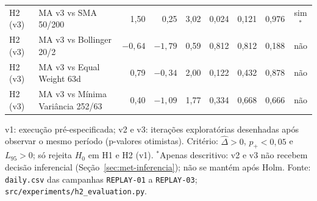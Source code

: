 \begin{table}[H]
{\begin{tabular}{llrrrrrrc}
H2 (v3) & MA v3 vs SMA 50/200 & 1{,}50 & 0{,}25 & 3{,}02 & 0{,}024 & 0{,}121 & 0{,}976 & sim$^{*}$ \\
H2 (v3) & MA v3 vs Bollinger 20/2 & $-0{,}64$ & $-1{,}79$ & 0{,}59 & 0{,}812 & 0{,}812 & 0{,}188 & não \\
H2 (v3) & MA v3 vs Equal Weight 63d & 0{,}79 & $-0{,}34$ & 2{,}00 & 0{,}122 & 0{,}432 & 0{,}878 & não \\
H2 (v3) & MA v3 vs Mínima Variância 252/63 & 0{,}40 & $-1{,}09$ & 1{,}77 & 0{,}334 & 0{,}668 & 0{,}666 & não \\
\bottomrule
\end{tabular}}
\par\smallskip\footnotesize v1: execução pré-especificada; v2 e v3: iterações exploratórias desenhadas após observar o mesmo período (p-valores otimistas). Critério: $\hat{\Delta} > 0$, $p_+ < 0{,}05$ e $L_{95} > 0$; só rejeita $H_0$ em H1 e H2 (v1). $^{*}$Apenas descritivo: v2 e v3 não recebem decisão inferencial (Seção~\ref{sec:met-inferencia}); não se mantém após Holm. Fonte: \texttt{daily.csv} das campanhas \texttt{REPLAY-01} a \texttt{REPLAY-03}; \texttt{src/experiments/h2\_evaluation.py}.
\end{table}
